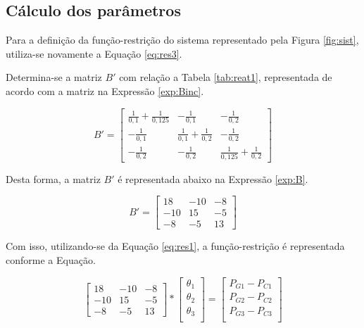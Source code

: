  	
\subsection{Cálculo dos parâmetros}
 	
 	Para a definição da função-restrição do sistema representado pela Figura \ref{fig:sist}, utiliza-se novamente a Equação \ref{eq:res3}.
 	
 	Determina-se a matriz $B'$ com relação a Tabela \ref{tab:reat1}, representada de acordo com a matriz na Expressão \ref{exp:Binc}.
 	
 	\begin{equation}
 		B' = \begin{bmatrix}
 		\frac{1}{0,1}+\frac{1}{0,125} & -\frac{1}{0,1} & -\frac{1}{0,2} \\[0.3em]
       -\frac{1}{0,1} & \frac{1}{0,1}+\frac{1}{0,2} & -\frac{1}{0,2} \\[0.3em]
       -\frac{1}{0,2} & -\frac{1}{0,2} & \frac{1}{0,125}+\frac{1}{0,2}\end{bmatrix}
       \label{exp:Binc}
     \end{equation}
     
     Desta forma, a matriz $B'$ é representada abaixo na Expressão \ref{exp:B}.
     
     \begin{equation}
    	B' = \begin{bmatrix}
       18 & -10 & -8 \\
       -10 & 15 & -5 \\
       -8 & -5 & 13\end{bmatrix}
       \label{exp:B}
		\end{equation}
		
	Com isso, utilizando-se da Equação \ref{eq:res1}, a função-restrição é representada conforme a Equação.
	
	\begin{equation}
		\begin{bmatrix}
       18 & -10 & -8 \\
       -10 & 15 & -5 \\
       -8 & -5 & 13\end{bmatrix} * 
       \begin{bmatrix}
       	\theta{_1} \\
       	\theta{_2} \\
       	\theta{_3} \\
       \end{bmatrix} = 
       \begin{bmatrix}
       	P_{G1} - P_{C1} \\
       	P_{G2} - P_{C2} \\
       	P_{G3} - P_{C3} \\
       \end{bmatrix}
       \label{exp:RES1}
	\end{equation}
 	
